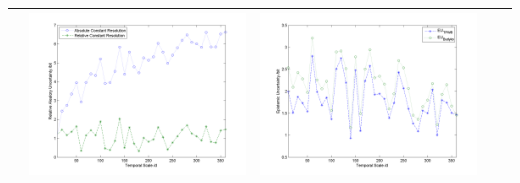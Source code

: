 \documentclass[11pt]{article}
\begin{document}
\begin{table}[H]
{\begin{tabular}{c  c   c   c  c }
&\begin{minipage}{.4\textwidth}\includegraphics[width=\linewidth]{resultgraph/07183000AU.png}\end{minipage}
&\begin{minipage}{.4\textwidth}\includegraphics[width=\linewidth]{resultgraph/07183000EU.png}\end{minipage}
\\ 
\bottomrule
\end{tabular}
}
\end{table}


 
     


\newpage
\begin{center}

\end{center}
\end{document}
